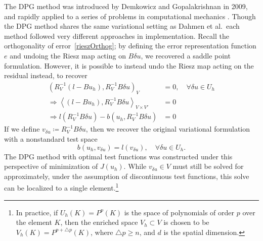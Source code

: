 \documentclass[final,leqno]{siamltex}
\newcommand{\LRp}[1]{\left( #1 \right)}
\newcommand{\LRa}[1]{\left\langle #1 \right\rangle}
\begin{document}
The DPG method was introduced by Demkowicz and Gopalakrishnan in 2009, and rapidly applied to a series of problems in computational mechanics \cite{DPG2,DPG3,DPG4,maxwellDPG,stokesDPG}.  Though the DPG method shares the same variational setting as Dahmen et al.\, each method followed very different approaches in implementation.  Recall the orthogonality of error~\eqref{rieszOrthog}; by defining the error representation function $e$ and undoing the Riesz map acting on $B\delta u$, we recovered a saddle point formulation.  However, it is possible to instead undo the Riesz map acting on the residual instead, to recover
\begin{align*}
\LRp{R_V^{-1}\LRp{l-Bu_h},R_V^{-1}B\delta u}_V &= 0, \quad \forall \delta u \in U_h\\
\Rightarrow \LRa{\LRp{l-Bu_h},R_V^{-1}B\delta u}_{V\times V'} &= 0\\
\Rightarrow l\LRp{R_V^{-1}B\delta u}-b\LRp{u_h,R_V^{-1}B\delta u} &= 0
\end{align*}
If we define $v_{\delta u} \coloneqq R_V^{-1}B\delta u$, then we recover the original variational formulation with a nonstandard test space
\[
b(u_h,v_{\delta u}) = l(v_{\delta u}), \quad \forall \delta u \in U_h.
\]
The DPG method with optimal test functions was constructed under this perspective of minimization of $J(u_h)$.  While $v_{\delta u} \in V$ must still be solved for approximately, under the assumption of discontinuous test functions, this solve can be localized to a single element.\footnote{In practice, if $U_h(K) = P^p(K)$ is the space of polynomials of order $p$ over the element $K$, then the enriched space $V_h \subset V$ is chosen to be $V_h(K) = P^{p+\triangle p}(K)$, where $\triangle p \geq n$, and $d$ is the spatial dimension.}
\end{document}
